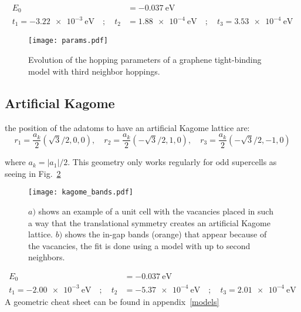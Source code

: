 \documentclass[a4paper]{article}
\begin{document}
\begin{equation}
\begin{split}
  E_0 &= \SI{-0.037}{\eV}\\
  t_1 = \SI{-3.22e-3}{\eV} \quad;\quad
  t_2 &= \SI{1.88e-4}{\eV} \quad;\quad
  t_3 = \SI{3.53e-4}{\eV}
\end{split}
\end{equation}

\begin{figure}[!ht!]
\centering
\texttt{[image: params.pdf]}
\vspace{-5pt}
\caption{Evolution of the hopping parameters of a graphene tight-binding model with third neighbor hoppings.}
\label{hopp}
\end{figure}
\FloatBarrier






\subsection{Artificial Kagome}
the position of the adatoms to have an artificial Kagome lattice are:
\begin{equation}
  r_1 = \frac{a_k}{2}\left(\sqrt{3}/2,  0 ,0\right),\quad
  r_2 = \frac{a_k}{2}\left(-\sqrt{3}/2,1,0\right),\quad
  r_3 = \frac{a_k}{2}\left(-\sqrt{3}/2,-1,0\right)
\end{equation}

where $a_k = |a_1|/2$. This geometry only works regularly for odd supercells as seeing in Fig.~\ref{kagome}


\begin{figure}[h!]
  \centering
  \texttt{[image: kagome\_bands.pdf]}
  \vspace{-5pt}
  \caption{$a)$ shows an example of a unit cell with the vacancies placed in such a way that the translational symmetry creates an artificial Kagome lattice. $b)$ shows the in-gap bands (orange) that appear because of the vacancies, the fit is done using a model with up to second neighbors.}
  \label{kagome}
\end{figure}
\FloatBarrier
\begin{equation}
\begin{split}
  E_0 &= \SI{-0.037}{\eV}\\
  t_1 = \SI{-2.00e-3}{\eV} \quad;\quad
  t_2 &= \SI{-5.37e-4}{\eV} \quad;\quad
  t_3 = \SI{2.01e-4}{\eV}
\end{split}
\end{equation}
A geometric cheat sheet can be found in appendix~\ref{models}
\end{document}
